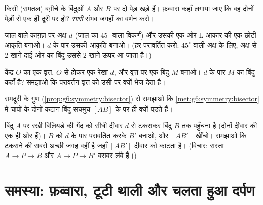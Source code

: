 \begin{exercise}[$\star\star$]\label{exo:g6:symmetry:8}
किसी (समतल) बग़ीचे के बिंदुओं $A$ और $B$ पर दो पेड़ खड़े हैं।
फ़व्वारा कहाँ लगाया जाए कि वह दोनों पेड़ों से एक ही दूरी पर हो?
\emph{सारी} संभव जगहों का वर्णन करो।
\end{exercise}

\begin{exercise}[$\star\star$]\label{exo:g6:symmetry:9}
जाल वाले काग़ज़ पर अक्ष $d$ (जाल का $45^\circ$ वाला विकर्ण) और
उसकी एक ओर L-आकार की एक छोटी आकृति बनाओ। $d$ के पार उसकी
 आकृति बनाओ। (हर  परावर्तित करो: $45^\circ$ वाली अक्ष
के लिए, अक्ष से $2$ खाने दाईं ओर का बिंदु उससे $2$ खाने ऊपर आ
जाता है।)
\end{exercise}

\begin{exercise}[$\star\star$]\label{exo:g6:symmetry:10}
केंद्र $O$ का एक वृत्त, $O$ से होकर एक रेखा $d$, और वृत्त पर एक
बिंदु $M$ बनाओ। $d$ के पार $M$ का  बिंदु कहाँ है? समझाओ
कि परावर्तन वृत्त को उसी पर क्यों भेज देता है।
\end{exercise}

\begin{exercise}[$\star\star$]\label{exo:g6:symmetry:11}
समदूरी के गुण (\cref{prop:g6:symmetry:bisector}) से समझाओ कि
\cref{met:g6:symmetry:bisector} में चापों के दोनों कटान-बिंदु
सचमुच $[AB]$ के  पर ही क्यों पड़ते हैं।
\end{exercise}

\begin{exercise}[$\star\star\star$]\label{exo:g6:symmetry:12}
बिंदु $A$ पर रखी बिलियर्ड की गेंद को सीधी दीवार $d$ से टकराकर
बिंदु $B$ तक पहुँचना है (दोनों दीवार की एक ही ओर हैं)। $B$ को
$d$ के पार परावर्तित करके $B'$ बनाओ, और  $[AB']$
खींचो। समझाओ कि टकराने की सबसे अच्छी जगह वहीं है जहाँ $[AB']$
दीवार को काटता है। (विचार: रास्ता $A \to P \to B$ और
$A \to P \to B'$ बराबर लंबे हैं।)
\end{exercise}

\section{समस्या: फ़व्वारा, टूटी थाली और चलता हुआ
दर्पण}


